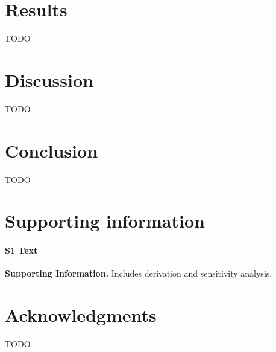 \documentclass[10pt,letterpaper]{article}
\begin{document}
\section*{Results}

TODO

\section*{Discussion}

TODO

\section*{Conclusion}

TODO

\section*{Supporting information}

\paragraph*{S1 Text}
\label{S1_Text}
{\bf Supporting Information.} Includes derivation and sensitivity analysis.

\section*{Acknowledgments}

TODO

\nolinenumbers


%
\end{document}
